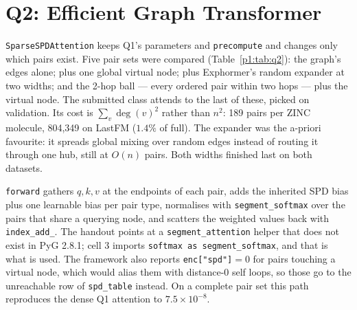 \section{Q2: Efficient Graph Transformer}

\texttt{SparseSPDAttention} keeps Q1's parameters and \texttt{precompute} and changes only which
pairs exist. Five pair sets were compared (Table~\ref{p1:tab:q2}): the graph's edges
alone; plus one global virtual node; plus Exphormer's random expander at two widths; and the
2-hop ball --- every ordered pair within two hops --- plus the virtual node. The
submitted class attends to the last of these, picked on validation. Its cost is
$\sum_v \deg(v)^2$ rather than $n^2$: 189 pairs per ZINC molecule, 804{,}349
on LastFM ($1.4\%$ of full). The expander was the a-priori favourite: it spreads global
mixing over random edges instead of routing it through one hub, still at $O(n)$ pairs. Both
widths finished last on both datasets.

\texttt{forward} gathers $q,k,v$ at the endpoints of each pair, adds the inherited SPD bias plus
one learnable bias per pair type, normalises with \texttt{segment\_softmax} over the pairs that
share a querying node, and scatters the weighted values back with \texttt{index\_\allowbreak{}add\_}. The
handout points at a \texttt{segment\_\allowbreak{}attention} helper that does not exist in PyG 2.8.1; cell 3
imports \texttt{softmax as\allowbreak{} segment\_\allowbreak{}softmax}, and that is what is used. The framework also
reports \texttt{enc["spd"]}$=0$ for pairs touching a virtual node, which would alias them with
distance-$0$ self loops, so those go to the unreachable row of \texttt{spd\_table} instead. On a complete pair set this path reproduces the dense Q1 attention to
$7.5\times10^{-8}$.

